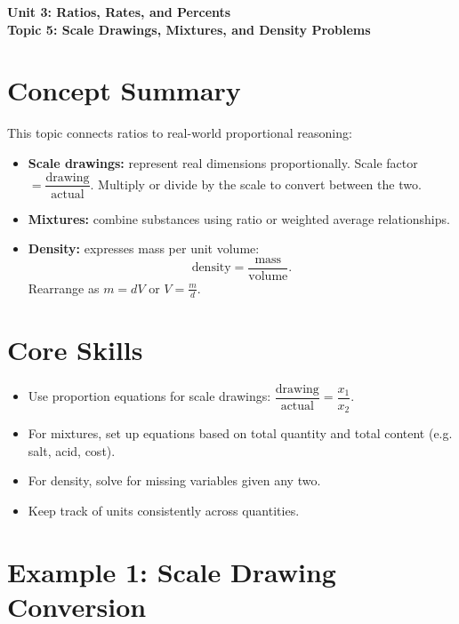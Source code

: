 \documentclass[14pt]{extarticle}
\begin{document}
\raggedright
{}

\begin{center}
    \LARGE \textbf{Unit 3: Ratios, Rates, and Percents} \\[6pt]
    \Large \textbf{Topic 5: Scale Drawings, Mixtures, and Density Problems}
\end{center}

\vspace{1em}

\section*{Concept Summary}

This topic connects ratios to real-world proportional reasoning:
\begin{itemize}
  \item \textbf{Scale drawings:} represent real dimensions proportionally.  
  Scale factor \(=\dfrac{\text{drawing}}{\text{actual}}\).  
  Multiply or divide by the scale to convert between the two.
  \item \textbf{Mixtures:} combine substances using ratio or weighted average relationships.
  \item \textbf{Density:} expresses mass per unit volume:  
  \[
  \text{density} = \frac{\text{mass}}{\text{volume}}.
  \]
  Rearrange as \(m = dV\) or \(V = \frac{m}{d}\).
\end{itemize}

\section*{Core Skills}
\begin{itemize}
  \item Use proportion equations for scale drawings: \(\dfrac{\text{drawing}}{\text{actual}}=\dfrac{x_1}{x_2}\).
  \item For mixtures, set up equations based on total quantity and total content (e.g. salt, acid, cost).
  \item For density, solve for missing variables given any two.
  \item Keep track of units consistently across quantities.
\end{itemize}

\section*{Example 1: Scale Drawing Conversion}
\end{document}
